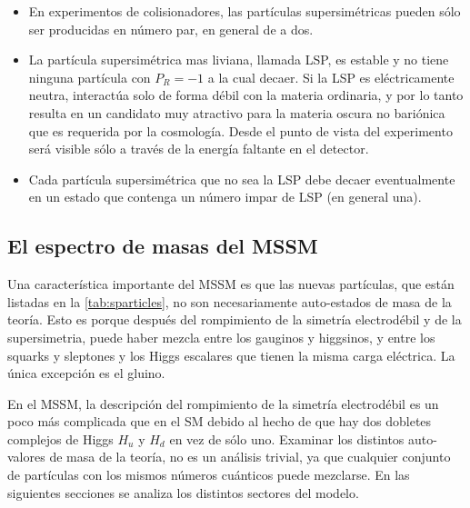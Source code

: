 \begin{itemize}
\item En experimentos de colisionadores, las partículas supersimétricas pueden
  sólo ser producidas en número par, en general de a dos.
\item La partícula supersimétrica mas liviana, llamada LSP, es estable y no tiene
  ninguna partícula con $P_R = -1$ a la cual decaer. Si
  la LSP es eléctricamente neutra, interactúa solo de forma débil con la materia
  ordinaria, y por lo tanto resulta en un candidato muy atractivo para la
  materia oscura no bariónica que es requerida por la cosmología. Desde el punto de
  vista del experimento será visible sólo a través de la energía faltante en el detector.
\item Cada partícula supersimétrica que no sea la LSP debe decaer eventualmente
  en un estado que contenga un número impar de LSP (en general una).
\end{itemize}



\subsection{El espectro de masas del MSSM}

Una característica importante del MSSM es que las nuevas partículas, que están
listadas en la \cref{tab:sparticles}, no son necesariamente auto-estados de masa
de la teoría. Esto es porque después del rompimiento de la simetría electrodébil
y de la supersimetria, puede haber mezcla entre los gauginos y higgsinos, y
entre los squarks y sleptones y los Higgs escalares que tienen la misma carga
eléctrica. La única excepción es el gluino.

En el MSSM, la descripción del rompimiento de la simetría electrodébil es un
poco más complicada que en el SM debido al hecho de que hay dos dobletes
complejos de Higgs $H_u$ y $H_d$ en vez de sólo uno.
Examinar los distintos auto-valores de masa de la teoría, no es un análisis
trivial, ya que cualquier conjunto de partículas con los mismos números
cuánticos puede mezclarse. En las siguientes secciones se analiza los distintos
sectores del modelo. %



